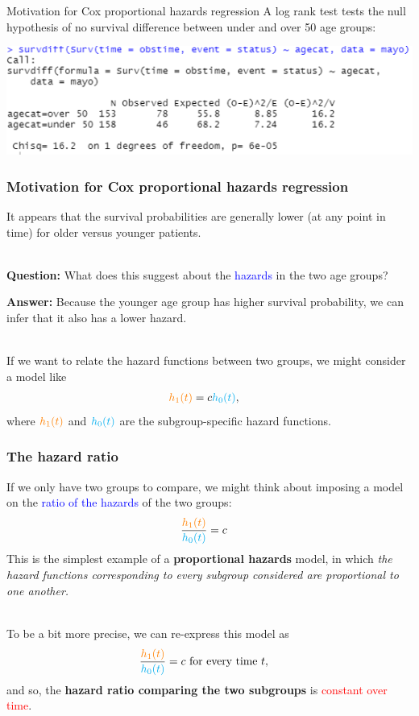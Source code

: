 \documentclass[10pt,t]{beamer}
\begin{document}
\begin{frame}{Motivation for Cox proportional hazards regression}
	A log rank test tests the null hypothesis of no survival difference between under and over 50 age groups:
	\begin{center}
		\includegraphics[width = \textwidth]{figs/logrank_agecat.png}
	\end{center}
\end{frame}

\begin{frame}
\frametitle{Motivation for Cox proportional hazards regression}

It appears that the survival probabilities are generally lower (at any point in time) for older versus younger patients. 
\\ ~\ 

\textbf{Question:} What does this suggest about the \textcolor{blue}{hazards} in the two age groups? \pause

\textbf{Answer:} Because the younger age group has higher survival probability, we can infer that it also has a lower hazard. 
\\ ~\ 

If we want to relate the hazard functions between two groups, we might consider a model like
\begin{align*}
\textcolor{orange}{h_1(t)} &= c\textcolor{cyan}{h_0(t)},
\end{align*}
where $\textcolor{orange}{h_1(t)}$ and $\textcolor{cyan}{h_0(t)}$ are the subgroup-specific hazard functions.
\end{frame}

\begin{frame}
\frametitle{The hazard ratio}
If we only have two groups to compare, we might think about imposing a model on the \textcolor{blue}{ratio of the hazards} of the two groups:
\begin{align*}
\frac{\textcolor{orange}{h_1(t)}}{\textcolor{cyan}{h_0(t)}} &= c
\end{align*}
This is the simplest example of a \textbf{proportional hazards} model, in which \textit{the hazard functions corresponding to every subgroup considered are proportional to one another.}
\\ ~\ 

To be a bit more precise, we can re-express this model as
\begin{align*}
\frac{\textcolor{orange}{h_1(t)}}{\textcolor{cyan}{h_0(t)}} &= c \text{ for every time } t,
\end{align*}
and so, the \textbf{hazard ratio comparing the two subgroups} is \textcolor{red}{constant over time}.

\end{frame}
\end{document}
